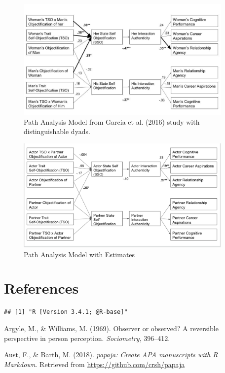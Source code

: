\documentclass[man]{apa6}
\begin{document}
\begin{figure}
\includegraphics[width=400px]{2016_figure} \caption{Path Analysis Model from Garcia et al. (2016) study with distinguishable dyads.}\label{fig:2016figure}
\end{figure}

\begin{figure}
\includegraphics[width=400px]{SEMfigure} \caption{Path Analysis Model with Estimates}\label{fig:semfigure}
\end{figure}

\newpage

\section{References}\label{references}

\begin{verbatim}
## [1] "R [Version 3.4.1; @R-base]"
\end{verbatim}

\begingroup
\setlength{\parindent}{-0.5in} \setlength{\leftskip}{0.5in}

\hypertarget{refs}{}
\hypertarget{ref-argyle1969}{}
Argyle, M., \& Williams, M. (1969). Observer or observed? A reversible
perspective in person perception. \emph{Sociometry}, 396--412.

\hypertarget{ref-R-papaja}{}
Aust, F., \& Barth, M. (2018). \emph{papaja: Create APA manuscripts with
R Markdown}. Retrieved from \url{https://github.com/crsh/papaja}
\end{document}
